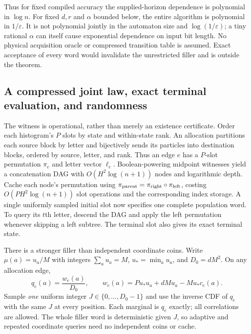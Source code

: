 \documentclass[11pt]{article}
\begin{document}
Thus for fixed compiled accuracy the supplied-horizon dependence is polynomial in $\log n$. For fixed $d,r$ and $\alpha$ bounded below, the entire algorithm is polynomial in $1/\varepsilon$. It is not polynomial jointly in the automaton size and $\log(1/\varepsilon)$; a tiny rational $\alpha$ can itself cause exponential dependence on input bit length. No physical acquisition oracle or compressed transition table is assumed. Exact acceptance of every word would invalidate the unrestricted filler and is outside the theorem.

\subsection{A compressed joint law, exact terminal evaluation, and randomness}

The witness is operational, rather than merely an existence certificate. Order each histogram's $P$ slots by state and within-state rank. An allocation partitions each source block by letter and bijectively sends its particles into destination blocks, ordered by source, letter, and rank. Thus an edge $e$ has a $P$-slot permutation $\pi_e$ and letter vector $\ell_e$. Boolean-powering midpoint witnesses yield a concatenation DAG with $O(H^2\log(n+1))$ nodes and logarithmic depth. Cache each node's permutation using $\pi_{\rm parent}=\pi_{\rm right}\circ\pi_{\rm left}$, costing $O(PH^2\log(n+1))$ slot operations and the corresponding index storage. A single uniformly sampled initial slot now specifies one complete population word. To query its $t$th letter, descend the DAG and apply the left permutation whenever skipping a left subtree. The terminal slot also gives its exact terminal state.

There is a stronger filler than independent coordinate coins. Write $\mu(a)=u_a/M$ with integers $\sum_a u_a=M$, $u_* =\min_a u_a$, and $D_0=dM^2$. On any allocation edge,
\[
q_e(a)=\frac{w_e(a)}{D_0},\qquad
w_e(a)=P u_*u_a+dM u_a-Mu_*c_e(a).
\tag{C6}
\]
Sample \emph{one} uniform integer $J\in\{0,\ldots,D_0-1\}$ and use the inverse CDF of $q_e$ with the same $J$ at every position. Each marginal is $q_e$ exactly; all correlations are allowed. The whole filler word is deterministic given $J$, so adaptive and repeated coordinate queries need no independent coins or cache.
\end{document}
